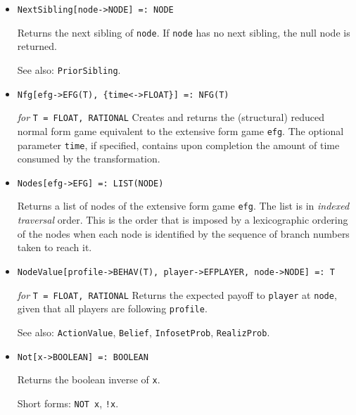 \begin{itemize}
\item
\protect \large \begin{verbatim}
NextSibling[node->NODE] =: NODE
\end{verbatim}\normalsize

\bd
Returns the next sibling of \verb+node+.  If \verb+node+ has no next
sibling, the null node is returned.
\item [See also:] \verb+PriorSibling+.
\ed

\item
\protect \large \begin{verbatim}
Nfg[efg->EFG(T), {time<->FLOAT}] =: NFG(T)
\end{verbatim}\normalsize

{\it for} {\tt T = FLOAT, RATIONAL}
\bd
Creates and returns the (structural) reduced normal form game equivalent
to the extensive form game \verb+efg+.  The optional parameter \verb+time+,
if specified, contains upon completion the amount of time consumed by
the transformation.
\ed

\item
\protect \large \begin{verbatim}
Nodes[efg->EFG] =: LIST(NODE)
\end{verbatim}\normalsize

\bd
Returns a list of nodes of the extensive form game \verb+efg+.  The
list is in {\it indexed traversal} order.  This is the order that is
imposed by a lexicographic ordering of the nodes when each node is
identified by the sequence of branch numbers taken to reach it.  
\ed

\item
\protect \large \begin{verbatim}
NodeValue[profile->BEHAV(T), player->EFPLAYER, node->NODE] =: T
\end{verbatim}\normalsize

{\it for} {\tt T = FLOAT, RATIONAL}
\bd
Returns the expected payoff to \verb+player+ at \verb+node+, given
that all players are following \verb+profile+.
\item [See also:] \verb+ActionValue+, \verb+Belief+, \verb+InfosetProb+,
\verb+RealizProb+.
\ed

\item
\protect \large \begin{verbatim}
Not[x->BOOLEAN] =: BOOLEAN
\end{verbatim}\normalsize

\bd
Returns the boolean inverse of \verb+x+.
\item [Short forms:] \verb+NOT x+, \verb+!x+.
\ed


\end{itemize}
